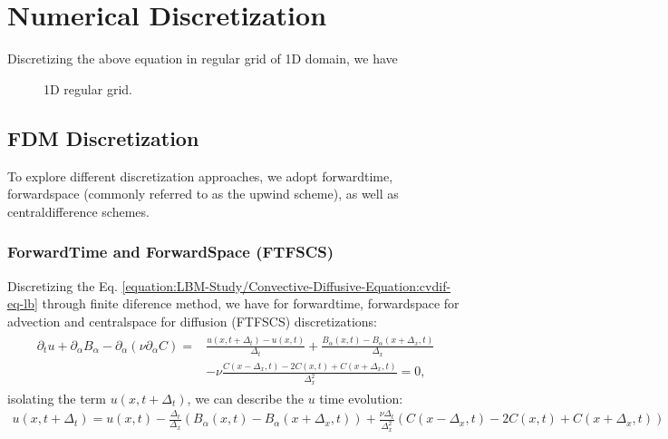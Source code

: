\documentclass[letterpaper,10pt,english,openany,oneside]{jupyterBook}
\begin{document}
\section{Numerical Discretization}
\label{\detokenize{LBM-Study/Convective-Diffusive-Equation:numerical-discretization}}
\sphinxAtStartPar
Discretizing the above equation in regular grid of 1D domain, we have

\begin{figure}[htbp]
\centering
\capstart

\noindent{}
\caption{1D regular grid.}\label{\detokenize{LBM-Study/Convective-Diffusive-Equation:mesh-1-convective-diffusive}}\end{figure}


\subsection{FDM Discretization}
\label{\detokenize{LBM-Study/Convective-Diffusive-Equation:fdm-discretization}}
\sphinxAtStartPar
To explore different discretization approaches, we adopt forward\sphinxhyphen{}time, forward\sphinxhyphen{}space (commonly referred to as the upwind scheme), as well as central\sphinxhyphen{}difference schemes.


\subsubsection{Forward\sphinxhyphen{}Time and Forward\sphinxhyphen{}Space (FTFSCS)}
\label{\detokenize{LBM-Study/Convective-Diffusive-Equation:forward-time-and-forward-space-ftfscs}}
\sphinxAtStartPar
Discretizing the Eq. \eqref{equation:LBM-Study/Convective-Diffusive-Equation:cvdif-eq-lb} through finite diference method, we have for forward\sphinxhyphen{}time, forward\sphinxhyphen{}space for advection and central\sphinxhyphen{}space for diffusion (FTFSCS) discretizations:
\begin{equation*}
\begin{split}
\begin{array}{ll}
\partial_t u + \partial_{\alpha}B_{\alpha} - \partial_{\alpha}\left(\nu \partial_{\alpha} C \right) = & \displaystyle\frac{u(x,t + \Delta_{t}) - u(x,t) }{\Delta_{t}} + \frac{B_{\alpha}(x,t) - B_{\alpha}(x + \Delta_{x},t) }{\Delta_{x}} \\
& - \nu \displaystyle\frac{ C(x - \Delta_{x},t) -2C(x,t) + C(x + \Delta_{x},t) }{\Delta_{x}^{2}} =0,
\end{array}
\end{split}
\end{equation*}
\sphinxAtStartPar
isolating the term \(u(x,t + \Delta_{t})\), we can describe the \(u\) time evolution:
\begin{equation*}
\begin{split}
u(x,t + \Delta_{t})   = u(x,t) - \frac{\Delta_{t}}{\Delta_{x}} \left( B_{\alpha}(x,t) - B_{\alpha}(x + \Delta_{x},t) \right) + \frac{\nu\Delta_{t}}{\Delta_{x}^{2}} \left( C(x - \Delta_{x},t) -2C(x,t) + C(x + \Delta_{x},t) \right) 
\end{split}
\end{equation*}
\end{document}
